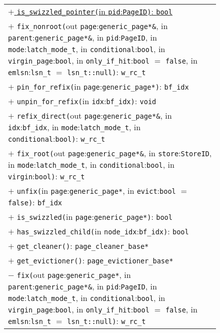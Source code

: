 \begin{@empty}
\begin{figure}[ht!]
{\begin{tabularx}{\textwidth}{|X|}
			\uline{$+$ \texttt{is\_swizzled\_pointer(}in \texttt{pid}:\texttt{PageID)}: \texttt{bool}}																						\\
			$+$ \texttt{fix\_nonroot(}out \texttt{page}:\texttt{generic\_page*\&}, in \texttt{parent}:\texttt{generic\_page*\&}, in \texttt{pid}:\texttt{PageID}, in \texttt{mode}:\texttt{latch\_mode\_t}, in \texttt{conditional}:\texttt{bool}, in \texttt{virgin\_page}:\texttt{bool}, in \texttt{only\_if\_hit}:\texttt{bool} $=$ \texttt{false}, in \texttt{emlsn}:\texttt{lsn\_t} $=$ \texttt{lsn\_t::null)}: \texttt{w\_rc\_t}												\\
			$+$ \texttt{pin\_for\_refix(}in \texttt{page}:\texttt{generic\_page*)}: \texttt{bf\_idx}																							\\
			$+$ \texttt{unpin\_for\_refix(}in \texttt{idx}:\texttt{bf\_idx)}: \texttt{void}																									\\
			$+$ \texttt{refix\_direct(}out \texttt{page}:\texttt{generic\_page*\&}, in \texttt{idx}:\texttt{bf\_idx}, in \texttt{mode}:\texttt{latch\_mode\_t}, in \texttt{conditional}:\texttt{bool)}: \texttt{w\_rc\_t}			\\
			$+$ \texttt{fix\_root(}out \texttt{page}:\texttt{generic\_page*\&}, in \texttt{store}:\texttt{StoreID}, in \texttt{mode}:\texttt{latch\_mode\_t}, in \texttt{conditional}:\texttt{bool}, in \texttt{virgin}:\texttt{bool)}: \texttt{w\_rc\_t}																																										\\
			$+$ \texttt{unfix(}in \texttt{page}:\texttt{generic\_page*}, in \texttt{evict}:\texttt{bool} $=$ \texttt{false)}: \texttt{bf\_idx}																\\
			$+$ \texttt{is\_swizzled(}in \texttt{page}:\texttt{generic\_page*)}: \texttt{bool}																							\\
			$+$ \texttt{has\_swizzled\_child(}in \texttt{node\_idx}:\texttt{bf\_idx)}: \texttt{bool}																						\\
			$+$ \texttt{get\_cleaner()}: \texttt{page\_cleaner\_base*}																											\\
			$+$ \texttt{get\_evictioner()}: \texttt{page\_evictioner\_base*}																										\\
			$-$ \texttt{fix(}out \texttt{page}:\texttt{generic\_page*}, in \texttt{parent}:\texttt{generic\_page*\&}, in \texttt{pid}:\texttt{PageID}, in \texttt{mode}:\texttt{latch\_mode\_t}, in \texttt{conditional}:\texttt{bool}, in \texttt{virgin\_page}:\texttt{bool}, in \texttt{only\_if\_hit}:\texttt{bool} $=$ \texttt{false}, in \texttt{emlsn}:\texttt{lsn\_t} $=$ \texttt{lsn\_t::null)}: \texttt{w\_rc\_t}												\\

\end{tabularx}}
\end{figure}
\end{@empty}
